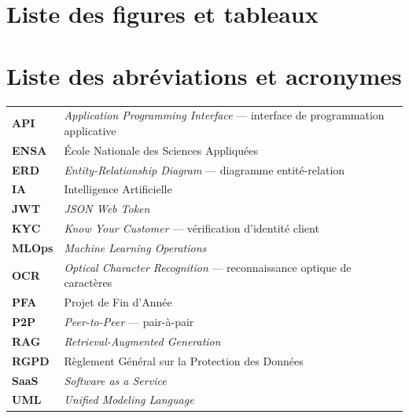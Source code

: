 \documentclass[12pt,a4paper]{report}
\begin{document}
\tableofcontents
\newpage

\chapter*{Liste des figures et tableaux}
\listoffigures
\listoftables
\newpage

\chapter*{Liste des abréviations et acronymes}
\begin{longtable}{p{3cm}p{11cm}}
\toprule
\textbf{API} & \textit{Application Programming Interface} — interface de programmation applicative \\
\textbf{ENSA} & École Nationale des Sciences Appliquées \\
\textbf{ERD} & \textit{Entity-Relationship Diagram} — diagramme entité-relation \\
\textbf{IA} & Intelligence Artificielle \\
\textbf{JWT} & \textit{JSON Web Token} \\
\textbf{KYC} & \textit{Know Your Customer} — vérification d'identité client \\
\textbf{MLOps} & \textit{Machine Learning Operations} \\
\textbf{OCR} & \textit{Optical Character Recognition} — reconnaissance optique de caractères \\
\textbf{PFA} & Projet de Fin d'Année \\
\textbf{P2P} & \textit{Peer-to-Peer} — pair-à-pair \\
\textbf{RAG} & \textit{Retrieval-Augmented Generation} \\
\textbf{RGPD} & Règlement Général sur la Protection des Données \\
\textbf{SaaS} & \textit{Software as a Service} \\
\textbf{UML} & \textit{Unified Modeling Language} \\
\bottomrule
\end{longtable}
\newpage
\end{document}
